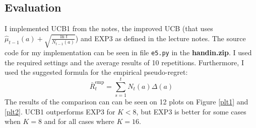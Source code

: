 \documentclass[a4paper]{article}
\begin{document}
\subsection{Evaluation}
\label{subsec:51}
I implemented UCB1 from the notes, the improved UCB (that uses
$\hat{\mu}_{t-1}(a)+\sqrt{\frac{\ln t}{N_{t-1}(a)}}$) and EXP3 as defined in the
lecture notes. The source code for my implementation can be seen in file
\texttt{e5.py} in the \textbf{handin.zip}. I used the required settings and the
average results of 10 repetitions. Furthermore, I used the suggested formula for
the empirical pseudo-regret:
\[
\bar{R}_{t}^{\mathrm{emp}}=\sum_{s=1}^{t} N_{t}(a) \Delta(a)
\]
The results of the comparison can can be seen on 12 plots on Figure \ref{plt1} and \ref{plt2}.
UCB1 outperforms EXP3 for $K<8$, but EXP3 is better for some cases
when $K=8$ and for all cases where $K=16$.
\end{document}
